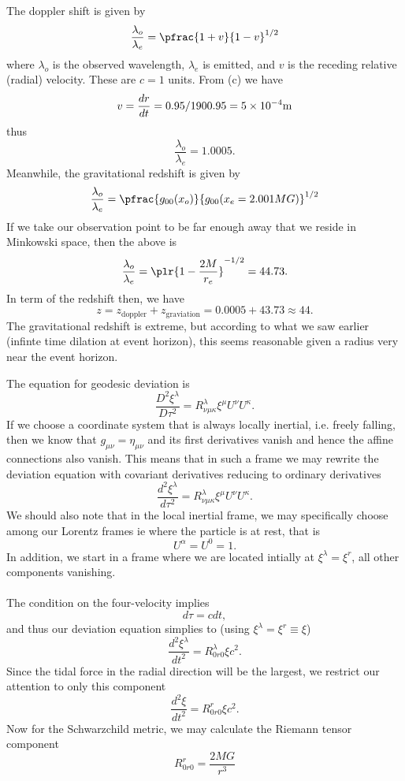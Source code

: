 \documentclass[10pt,letterpaper]{article}
\begin{document}
The doppler shift is given by 
\[
	\frac{\lambda_o}{\lambda_e} = \pfrac{1+v}{1-v}^{1/2}
\]
where $\lambda_o$ is the observed wavelength, $\lambda_e$ is emitted, and $v$ is the receding relative (radial) velocity. These are $c=1$ units. From (c) we have 
\[
	v=\frac{dr}{dt} = 0.95/1900.95 = 5\times 10^{-4}\text m
\]
thus
\[
	\frac{\lambda_o}{\lambda_e} = 1.0005.
\]
Meanwhile, the gravitational redshift is given by
\[
	\frac{\lambda_o}{\lambda_e}  = \pfrac{g_{00}(x_o)}{g_{00}(x_e=2.001MG)}^{1/2}
\]
If we take our observation point to be far enough away that we reside in Minkowski space, then the above is
\[
	\frac{\lambda_o}{\lambda_e} = \plr{1-\frac{2M}{r_e}}^{-1/2} = 44.73.
\]
In term of the redshift then, we have
\[
	z = z_{\text{doppler}}+z_{\text{graviation}} = 0.0005+43.73 \approx 44.
\]
The gravitational redshift is extreme, but according to what we saw earlier (infinte time dilation at event horizon), this seems reasonable given a radius very near the event horizon. 
\\
\eenum
\item 
The equation for geodesic deviation is
\[
	\frac{D^2\xi^\lambda}{D\tau^2} = R^\lambda_{\nu\mu\kappa}\xi^\mu U^\nu U^\kappa.
\]
If we choose a coordinate system that is always locally inertial, i.e. freely falling, then we know that $g_{\mu\nu}=\eta_{\mu\nu}$ and its first derivatives vanish and hence the affine connections also vanish. This means that in such a frame we may rewrite the deviation equation with covariant derivatives reducing to ordinary derivatives
\[
	\frac{d^2\xi^\lambda}{d\tau^2} = R^\lambda_{\nu\mu\kappa}\xi^\mu U^\nu U^\kappa.
\]
We should also note that in the local inertial frame, we may specifically choose among our Lorentz frames ie where the particle is at rest, that is
\[
	U^\alpha = U^0 = 1.
\]
In addition, we start in a frame where we are located intially at $\xi^\lambda = \xi^r$, all other components vanishing. \\ \\
The condition on the four-velocity implies
\[
	d\tau = cdt,
\] 
and thus our deviation equation simplies to (using $\xi^\lambda = \xi^r\equiv \xi$)
\[
	\frac{d^2\xi^\lambda}{dt^2} = R^\lambda_{0r0}\xi c^2.
\]
Since the tidal force in the radial direction will be the largest, we restrict our attention to only this component
\[
	\frac{d^2\xi}{dt^2} = R^r_{0r0}\xi c^2.
\]	
Now for the Schwarzchild metric, we may calculate the Riemann tensor component
\[
	R^r_{0r0} = \frac{2MG}{r^3}
\]
\end{document}
